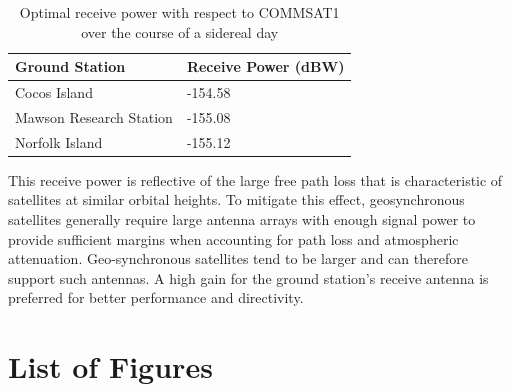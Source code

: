 \documentclass[12pt]{article}
\begin{document}
\begin{table}[H]
\begin{tabular}{ll}
\hline
Ground Station          & Receive Power (dBW) \\ \hline
Cocos Island            & -154.58             \\
Mawson Research Station & -155.08             \\
Norfolk Island          & -155.12             \\ \hline
\end{tabular}
\caption{Optimal receive power with respect to COMMSAT1 over the course of a sidereal day}
\label{table:opt_power}
\end{table}

This receive power is reflective of the large free path loss that is characteristic of satellites at similar orbital heights. To mitigate this effect, geosynchronous satellites generally require large antenna arrays with enough signal power to provide sufficient margins when accounting for path loss and atmospheric attenuation. Geo-synchronous satellites tend to be larger and can therefore support such antennas. A high gain for the ground station's receive antenna is preferred for better performance and directivity.

\newpage
\section{List of Figures}
\end{document}
